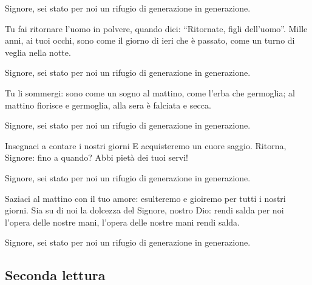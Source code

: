 	\begin{dialoghi}
		\item[\assemblea] {Signore, sei stato per noi un rifugio di generazione in generazione.}
		\item[\lettore] Tu fai ritornare l'uomo in polvere,
		quando dici: \textquotedblleft Ritornate, figli dell'uomo\textquotedblright.
		Mille anni, ai tuoi occhi,
		sono come il giorno di ieri che è passato,
		come un turno di veglia nella notte.
		\item[\assemblea] {Signore, sei stato per noi un rifugio di generazione in generazione.}
		\item[\lettore] Tu li sommergi:
		sono come un sogno al mattino,
		come l'erba che germoglia;
		al mattino fiorisce e germoglia,
		alla sera è falciata e secca.
		\item[\assemblea] {Signore, sei stato per noi un rifugio di generazione in generazione.}
		\item[\lettore] Insegnaci a contare i nostri giorni
		E acquisteremo un cuore saggio.
		Ritorna, Signore: fino a quando?
		Abbi pietà dei tuoi servi!
		\item[\assemblea] {Signore, sei stato per noi un rifugio di generazione in generazione.}
		\item[\lettore] Saziaci al mattino con il tuo amore:
		esulteremo e gioiremo per tutti i nostri giorni.
		Sia su di noi la dolcezza del Signore, nostro Dio:
		rendi salda per noi l'opera delle nostre mani,
		l'opera delle nostre mani rendi salda.
		\item[\assemblea] {Signore, sei stato per noi un rifugio di generazione in generazione.}
	\end{dialoghi}

\subsection*{Seconda lettura}

